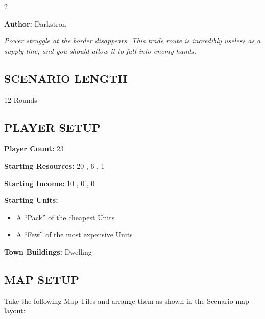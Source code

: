 
\begin{multicols*}{2}

\textbf{Author:} Darkstron

\textit{Power struggle at the border disappears. This trade route is incredibly useless as a supply line, and you should allow it to fall into enemy hands.}

\subsection*{\MakeUppercase{Scenario Length}}
12 Rounds

\subsection*{\MakeUppercase{Player Setup}}
\textbf{Player Count:} 23

\textbf{Starting Resources:} 20 , 6 , 1 

\textbf{Starting Income:} 10 , 0 , 0 

\textbf{Starting Units:}

\begin{itemize}
  \item A ``Pack'' of the cheapest  Units
  \item A ``Few'' of the most expensive  Units
\end{itemize}

\textbf{Town Buildings:}  Dwelling

\subsection*{\MakeUppercase{Map Setup}}

Take the following Map Tiles and arrange them as shown in the Scenario map layout:



\end{multicols*}
